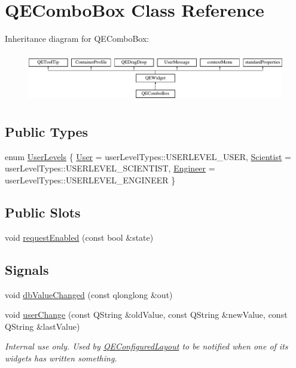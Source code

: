 \hypertarget{classQEComboBox}{
\section{QEComboBox Class Reference}
\label{classQEComboBox}
}
Inheritance diagram for QEComboBox:\begin{figure}[H]
\begin{center}
\leavevmode
\includegraphics[height=2.204725cm]{classQEComboBox}
\end{center}
\end{figure}
\subsection*{Public Types}
\begin{DoxyCompactItemize}
\item 
enum \hyperlink{classQEComboBox_a7da014f2f323780d302cdf17ff2a5fa8}{UserLevels} \{ \hyperlink{classQEComboBox_a7da014f2f323780d302cdf17ff2a5fa8acc97c1c01410fee68db6a4da13871424}{User} =  userLevelTypes::USERLEVEL\_\-USER, 
\hyperlink{classQEComboBox_a7da014f2f323780d302cdf17ff2a5fa8afaaa01414c1cf1e1f0014bad16cd8fb0}{Scientist} =  userLevelTypes::USERLEVEL\_\-SCIENTIST, 
\hyperlink{classQEComboBox_a7da014f2f323780d302cdf17ff2a5fa8a141f615a1b2da3b713be0aba91c7a520}{Engineer} =  userLevelTypes::USERLEVEL\_\-ENGINEER
 \}
\end{DoxyCompactItemize}
\subsection*{Public Slots}
\begin{DoxyCompactItemize}
\item 
void \hyperlink{classQEComboBox_a05b608b96c10af88bb7652f22c57b2ca}{requestEnabled} (const bool \&state)
\end{DoxyCompactItemize}
\subsection*{Signals}
\begin{DoxyCompactItemize}
\item 
void \hyperlink{classQEComboBox_aca70dbae26ca2c26c87636fe46d9cb88}{dbValueChanged} (const qlonglong \&out)
\item 
\hypertarget{classQEComboBox_ae7a4f2375c7bc9917b23f4c2702b95f9}{
void \hyperlink{classQEComboBox_ae7a4f2375c7bc9917b23f4c2702b95f9}{userChange} (const QString \&oldValue, const QString \&newValue, const QString \&lastValue)}
\label{classQEComboBox_ae7a4f2375c7bc9917b23f4c2702b95f9}

\begin{DoxyCompactList}\small\item\em Internal use only. Used by \hyperlink{classQEConfiguredLayout}{QEConfiguredLayout} to be notified when one of its widgets has written something. \end{DoxyCompactList}\end{DoxyCompactItemize}
